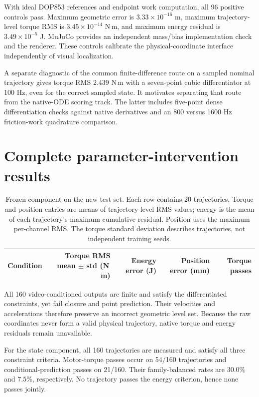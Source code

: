 \documentclass[10pt,twocolumn,letterpaper]{article}
\begin{document}
With ideal DOP853 references and endpoint work computation, all 96 positive controls pass. Maximum geometric error is $3.33\times10^{-16}$ m, maximum trajectory-level torque RMS is $3.45\times10^{-14}$ N\,m, and maximum energy residual is $3.49\times10^{-5}$ J. MuJoCo provides an independent mass/bias implementation check and the renderer. These controls calibrate the physical-coordinate interface independently of visual localization.

A separate diagnostic of the common finite-difference route on a sampled nominal trajectory gives torque RMS $2.439$ N\,m with a seven-point cubic differentiator at 100 Hz, even for the correct sampled state. It motivates separating that route from the native-ODE scoring track. The latter includes five-point dense differentiation checks against native derivatives and an 800 versus 1600 Hz friction-work quadrature comparison.

\section{Complete parameter-intervention results}
\label{app:allresults}
\begin{table}[t]
\caption{Frozen \stater{} component on the new test set. Each row contains 20 trajectories. Torque and position entries are means of trajectory-level RMS values; energy is the mean of each trajectory's maximum cumulative residual. Position uses the maximum per-channel RMS. The torque standard deviation describes trajectories, not independent training seeds.}
\centering
\small
\begin{tabular}{lrrrr}
\toprule
Condition & Torque RMS mean $\pm$ std (N\,m) & Energy error (J) & Position error (mm) & Torque passes\\
\midrule

\bottomrule
\end{tabular}
\end{table}

All 160 video-conditioned outputs are finite and satisfy the differentiated constraints, yet fail closure and point prediction. Their velocities and accelerations therefore preserve an incorrect geometric level set. Because the raw coordinates never form a valid physical trajectory, native torque and energy residuals remain unavailable.

For the state component, all 160 trajectories are measured and satisfy all three constraint criteria. Motor-torque passes occur on 54/160 trajectories and conditional-prediction passes on 21/160. Their family-balanced rates are $30.0\%$ and $7.5\%$, respectively. No trajectory passes the energy criterion, hence none passes jointly.
\end{document}
